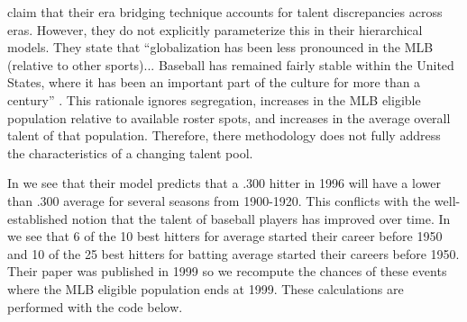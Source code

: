 \documentclass[11pt]{article}\usepackage[]{graphicx}\usepackage[]{color}
\begin{document}
\citet{berry1999eras} claim that their era bridging technique accounts for 
talent discrepancies across eras.  However, they do not explicitly 
parameterize this in their hierarchical models.  They state that 
``globalization has been less pronounced in the MLB (relative to other 
sports)... Baseball has remained fairly stable within the 
United States, where it has been an important part of the culture for more 
than a century'' \citep{berry1999eras}.  This rationale ignores 
segregation, increases in the MLB eligible population 
relative to available roster spots, and increases in the average overall 
talent of that population.  %
Therefore, there methodology does not fully address the characteristics 
of a changing talent pool.  %

In \citet[panel (c) of Figure 7]{berry1999eras} we see that their model 
predicts that a .300 hitter in 1996 will have a lower than .300 average for 
several seasons from 1900-1920.  This conflicts with the well-established 
notion that the talent of baseball players has improved over time.  
In \citet[Table 9]{berry1999eras} we see that 6 of the 10 best hitters 
for average started their career before 1950 and 10 of the 25 best hitters 
for batting average started their careers before 1950.  Their paper was 
published in 1999 so we recompute the chances of these events where the MLB 
eligible population ends at 1999. %
These calculations are performed with the code below.
\end{document}

